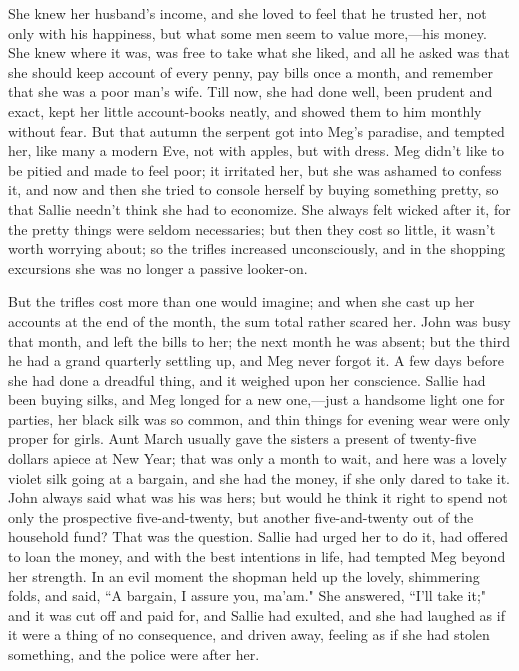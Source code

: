 She knew her husband's income, and she loved to feel
that he trusted her, not only with his happiness, but what some men seem
to value more,---his money. She knew where it was, was free to take what
she liked, and all he asked was that she should keep account of every
penny, pay bills once a month, and remember that she was a poor
man's wife. Till now, she had done well, been prudent
and exact, kept her little account-books neatly, and showed them to him
monthly without fear. But that autumn the serpent got into
Meg's paradise, and tempted her, like many a modern Eve,
not with apples, but with dress. Meg didn't like to be
pitied and made to feel poor; it irritated her, but she was ashamed to
confess it, and now and then she tried to console herself by buying
something pretty, so that Sallie needn't think she had
to economize. She always felt wicked after it, for the pretty things
were seldom necessaries; but then they cost so little, it
wasn't worth worrying about; so the trifles increased
unconsciously, and in the shopping excursions she was no longer a
passive looker-on.

But the trifles cost more than one would imagine; and when she cast up
her accounts at the end of the month, the sum total rather scared her.
John was busy that month, and left the bills to her; the next month he
was absent; but the third he had a grand quarterly settling up, and Meg
never forgot it. A few days before she had done a dreadful thing, and it
weighed upon her conscience. Sallie had been buying silks, and Meg
longed for a new one,---just a handsome light one for parties, her black
silk was so common, and thin things for evening wear were only proper
for girls. Aunt March usually gave the sisters a present of twenty-five
dollars apiece at New Year; that was only a month to wait, and here was
a lovely violet silk going at a bargain, and she had the money, if she
only dared to take it. John always said what was his was hers; but would
he think it right to spend not only the prospective five-and-twenty, but
another five-and-twenty out of the household fund? That was the
question. Sallie had urged her to do it, had offered to loan the money,
and with the best intentions in life, had tempted Meg beyond her
strength. In an evil moment the shopman held up the lovely, shimmering
folds, and said, ``A bargain, I assure you, ma'am." She
answered, ``I'll take it;" and it was cut off and paid
for, and Sallie had exulted, and she had laughed as if it were a thing
of no consequence, and driven away, feeling as if she had stolen
something, and the police were after her.

